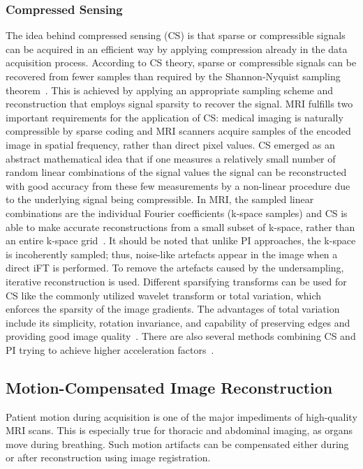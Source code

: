 \subsubsection{Compressed Sensing}
The idea behind compressed sensing (CS) is that sparse or compressible signals can be acquired in an efficient way by applying compression already in the data acquisition process. According to CS theory, sparse or compressible signals can be recovered from fewer samples than required by the Shannon-Nyquist sampling theorem~\cite{CS-MRI}. This is achieved by applying an appropriate sampling scheme and reconstruction that employs signal sparsity to recover the signal. MRI fulfills two important requirements for the application of CS: medical imaging is naturally compressible by sparse coding and MRI scanners acquire samples of the encoded image in spatial frequency, rather than direct pixel values. CS emerged as an abstract mathematical idea that if one measures a relatively small number of random linear combinations of the signal values the signal can be reconstructed with good accuracy from these few measurements by a non-linear procedure due to the underlying signal being compressible. In MRI, the sampled linear combinations are the individual Fourier coefficients (k-space samples) and CS is able to make accurate reconstructions from a small subset of k-space, rather than an entire k-space grid~\cite{CS-MRI}. It should be noted that unlike PI approaches, the k-space is incoherently sampled; thus, noise-like artefacts appear in the image when a direct iFT is performed. To remove the artefacts caused by the undersampling, iterative reconstruction is used. Different sparsifying transforms can be used for CS like the commonly utilized wavelet transform or total variation, which enforces the sparsity of the image gradients. The advantages of total variation include its simplicity, rotation invariance, and capability of preserving edges and providing good image quality~\cite{PulseSequences}. There are also several methods combining CS and PI trying to achieve higher acceleration factors~\cite{PI+CS, PI+CS2}.

\subsection{Motion-Compensated Image Reconstruction} \label{SubSec:Motion-CompensatedReconstruction}
Patient motion during acquisition is one of the major impediments of high-quality MRI scans. This is especially true for thoracic and abdominal imaging, as organs move during breathing. Such motion artifacts can be compensated either during or after reconstruction using image registration.


